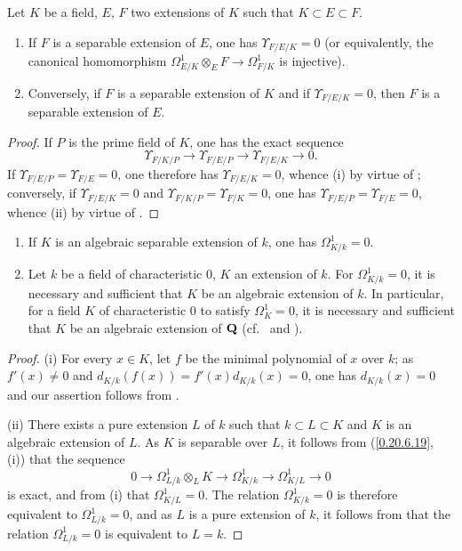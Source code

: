 \begin{corollary}[20.6.19]
\label{0.20.6.19}
Let $K$ be a field, $E$, $F$ two extensions of $K$ such that $K\subset E\subset F$.
\begin{enumerate}
  \item[\rm(i)] If $F$ is a separable extension of $E$, one has $\Upsilon_{F/E/K}=0$ \textup{(}or equivalently, the canonical homomorphism $\Omega^1_{E/K}\otimes_E F\to\Omega^1_{F/K}$ is injective\textup{)}.
  \item[\rm(ii)] Conversely, if $F$ is a separable extension of $K$ and if $\Upsilon_{F/E/K}=0$, then $F$ is a separable extension of $E$.
\end{enumerate}
\end{corollary}

\begin{proof}
If $P$ is the prime field of $K$, one has the exact sequence 
\[
  \Upsilon_{F/K/P}\to\Upsilon_{F/E/P}\to\Upsilon_{F/E/K}\to 0.
\]
If $\Upsilon_{F/E/P}=\Upsilon_{F/E}=0$, one therefore has $\Upsilon_{F/E/K}=0$, whence (i) by virtue of ; conversely, if $\Upsilon_{F/E/K}=0$ and $\Upsilon_{F/K/P}=\Upsilon_{F/K}=0$, one has $\Upsilon_{F/E/P}=\Upsilon_{F/E}=0$, whence (ii) by virtue of .
\end{proof}

\begin{corollary}[20.6.20]
\label{0.20.6.20}
\begin{enumerate}
  \item[\rm(i)] If $K$ is an algebraic separable extension of $k$, one has $\Omega^1_{K/k}=0$.
  \item[\rm(ii)] Let $k$ be a field of characteristic $0$, $K$ an extension of $k$.
  For $\Omega^1_{K/k}=0$, it is necessary and sufficient that $K$ be an algebraic extension of $k$.
  In particular, for a field $K$ of characteristic $0$ to satisfy $\Omega^1_K=0$, it is necessary and sufficient that $K$ be an algebraic extension of $\mathbf{Q}$ (cf.\  and ).
\end{enumerate}
\end{corollary}

\begin{proof}
(i) For every $x\in K$, let $f$ be the minimal polynomial of $x$ over $k$; as $f'(x)\neq 0$ and $d_{K/k}(f(x))=f'(x)d_{K/k}(x)=0$, one has $d_{K/k}(x)=0$ and our assertion follows from .

(ii) There exists a pure extension $L$ of $k$ such that $k\subset L\subset K$ and $K$ is an algebraic extension of $L$.
As $K$ is separable over $L$, it follows from (\ref{0.20.6.19}, (i)) that the sequence
\[
  0\to\Omega^1_{L/k}\otimes_L K\to\Omega^1_{K/k}\to\Omega^1_{K/L}\to 0
\]
is exact, and from (i) that $\Omega^1_{K/L}=0$.
The relation $\Omega^1_{K/k}=0$ is therefore equivalent to $\Omega^1_{L/k}=0$, and as $L$ is a pure extension of $k$, it follows from  that the relation $\Omega^1_{L/k}=0$ is equivalent to $L=k$.
\end{proof}

